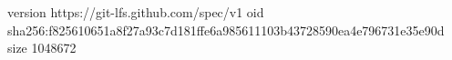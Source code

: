 version https://git-lfs.github.com/spec/v1
oid sha256:f825610651a8f27a93c7d181ffe6a985611103b43728590ea4e796731e35e90d
size 1048672
